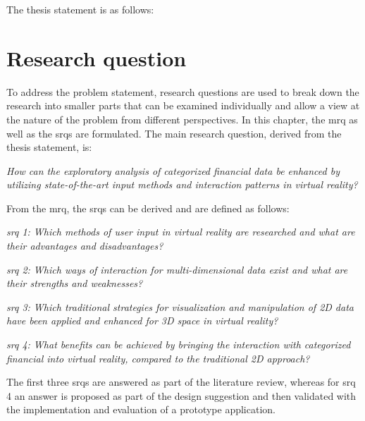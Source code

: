 The thesis statement is as follows:
\begin{framed}
	\textit{\thesisstatementtext}
\end{framed}


\section{Research question}

\newcommand{\mrqtext}{How can the exploratory analysis of categorized financial data be enhanced by utilizing state-of-the-art input methods and interaction patterns in virtual reality?}

\newcommand{\srqonetext}{Which methods of user input in virtual reality are researched and what are their advantages and disadvantages?}
\newcommand{\srqtwotext}{Which ways of interaction for multi-dimensional data exist and what are their strengths and weaknesses?}
\newcommand{\srqthreetext}{Which traditional strategies for visualization and manipulation of 2D data have been applied and enhanced for 3D space in virtual reality?}
\newcommand{\srqfourtext}{What benefits can be achieved by bringing the interaction with categorized financial into virtual reality, compared to the traditional 2D approach?}

To address the problem statement, research questions are used to break down the research into smaller parts that can be examined individually and allow a view at the nature of the problem from different perspectives. In this chapter, the \gls{mrq} as well as the \glspl{srq} are formulated. \newline
The main research question, derived from the thesis statement, is:
\begin{framed}
	\textit{\mrqtext}
\end{framed} \label{MRQ}
From the \gls{mrq}, the \glspl{srq} can be derived and are defined as follows:
\begin{framed}
	\textit{\gls{srq} 1: \srqonetext}
\end{framed} \label{SRQ1}
\begin{framed}
	\textit{\gls{srq} 2: \srqtwotext}
\end{framed} \label{SRQ2}
\begin{framed}
	\textit{\gls{srq} 3: \srqthreetext}
\end{framed} \label{SRQ3}
 \begin{framed}
 	\textit{\gls{srq} 4: \srqfourtext}
 \end{framed} \label{SRQ4}
The first three \glspl{srq} are answered as part of the literature review, whereas for \gls{srq} 4 an answer is proposed as part of the design suggestion and then validated with the implementation and evaluation of a prototype application.


